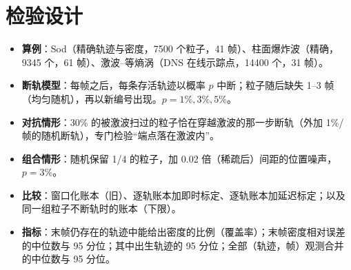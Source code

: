 \section{检验设计}
\begin{itemize}
\item \textbf{算例}：Sod（精确轨迹与密度，7500 个粒子，41 帧）、柱面爆炸波（精确，9345 个，61 帧）、激波–等熵涡（DNS 在线示踪点，14400 个，31 帧）。
\item \textbf{断轨模型}：每帧之后，每条存活轨迹以概率 $p$ 中断；粒子随后缺失 1–3 帧（均匀随机），再以新编号出现。$p=1\%,3\%,5\%$。
\item \textbf{对抗情形}：30\% 的被激波扫过的粒子恰在穿越激波的那一步断轨（外加 1\%/帧的随机断轨），专门检验“端点落在激波内”。
\item \textbf{组合情形}：随机保留 1/4 的粒子，加 0.02 倍（稀疏后）间距的位置噪声，$p=3\%$。
\item \textbf{比较}：窗口化账本（旧）、逐轨账本加即时标定、逐轨账本加延迟标定；以及同一组粒子不断轨时的账本（下限）。
\item \textbf{指标}：末帧仍存在的轨迹中能给出密度的比例（覆盖率）；末帧密度相对误差的中位数与 95 分位；其中出生轨迹的 95 分位；全部（轨迹，帧）观测合并的中位数与 95 分位。
\end{itemize}
